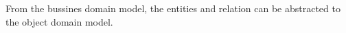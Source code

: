 
From the bussines domain model, 
the entities and relation can be abstracted to the object domain model.

